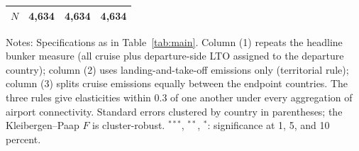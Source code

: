 \documentclass[12pt]{article}
\begin{document}
\begin{table}[H]
{\begin{threeparttable}
\begin{tabular}{lccc}
  $N$ & 4,634 & 4,634 & 4,634 \\
\bottomrule
\end{tabular}
\begin{tablenotes}[flushleft]
\footnotesize
\item Notes: Specifications as in Table~\ref{tab:main}. Column (1) repeats the headline bunker measure (all cruise plus departure-side LTO assigned to the departure country); column (2) uses landing-and-take-off emissions only (territorial rule); column (3) splits cruise emissions equally between the endpoint countries. The three rules give elasticities within 0.3 of one another under every aggregation of airport connectivity. Standard errors clustered by country in parentheses; the Kleibergen--Paap $F$ is cluster-robust. $^{***}$, $^{**}$, $^{*}$: significance at 1, 5, and 10 percent.
\end{tablenotes}
\end{threeparttable}}
\end{table}
\end{document}
